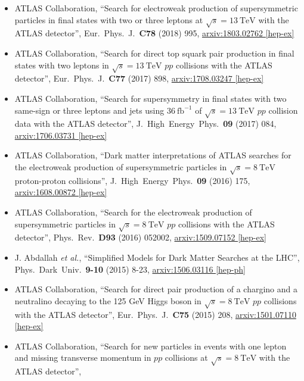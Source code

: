 \documentclass[a4paper,10pt]{article}
\begin{document}
\begin{itemize}
	\item ATLAS Collaboration,
	``Search for electroweak production of supersymmetric particles in final states with two or three leptons at $\sqrt{s}=13\ \mathrm{TeV}$ with the ATLAS detector'',
	Eur.\ Phys.\ J.\ {\bf C78} (2018) 995,
	\href{https://arxiv.org/abs/1803.02762}{arxiv:1803.02762 [hep-ex]}
	\item ATLAS Collaboration,
	``Search for direct top squark pair production in final states with two leptons in $\sqrt{s}=13\ \mathrm{TeV}$ $pp$ collisions with the ATLAS detector'',
	Eur.\ Phys.\ J.\ {\bf C77} (2017) 898,
	\href{https://arxiv.org/abs/1708.03247}{arxiv:1708.03247 [hep-ex]}
	\item ATLAS Collaboration,
	``Search for supersymmetry in final states with two same-sign or three leptons and jets using $36\ \mathrm{fb}^{-1}$ of $\sqrt{s}=13\ \mathrm{TeV}$ $pp$ collision data with the ATLAS detector'',
	J.\ High\ Energy\ Phys.\ {\bf 09} (2017) 084,
	\href{https://arxiv.org/abs/1706.03731}{arxiv:1706.03731 [hep-ex]}
	\item ATLAS Collaboration,
	``Dark matter interpretations of ATLAS searches for the electroweak production of supersymmetric particles in $\sqrt{s} = 8\ \mathrm{TeV}$ proton-proton collisions'',
	J.\ High\ Energy\ Phys.\ {\bf 09} (2016) 175,
	\href{http://arxiv.org/abs/1608.00872}{arxiv:1608.00872 [hep-ex]}
	\item ATLAS Collaboration,
	``Search for the electroweak production of supersymmetric particles in $\sqrt{s} = 8\ \mathrm{TeV}$ $pp$ collisions with the ATLAS detector'',
	Phys.\ Rev.\ {\bf D93} (2016) 052002,
	\href{http://arxiv.org/abs/1509.07152}{arxiv:1509.07152 [hep-ex]}
	\item J. Abdallah {\it et al.},
	``Simplified Models for Dark Matter Searches at the LHC'',
	Phys.\ Dark\ Univ.\ {\bf 9-10} (2015) 8-23,
	\href{http://arxiv.org/abs/1506.03116}{arxiv:1506.03116 [hep-ph]}
	\item ATLAS Collaboration,
	``Search for direct pair production of a chargino and a neutralino decaying to the 125 GeV Higgs boson in $\sqrt{s} = 8\ \mathrm{TeV}$ $pp$ collisions with the ATLAS detector'',
	Eur.\ Phys.\ J.\ {\bf C75} (2015) 208,
	\href{http://arxiv.org/abs/1501.07110}{arxiv:1501.07110 [hep-ex]}
	\item ATLAS Collaboration,
	``Search for new particles in events with one lepton and missing transverse momentum in $pp$ collisions at $\sqrt{s} = 8\ \mathrm{TeV}$ with the ATLAS detector'',

\end{itemize}
\end{document}
